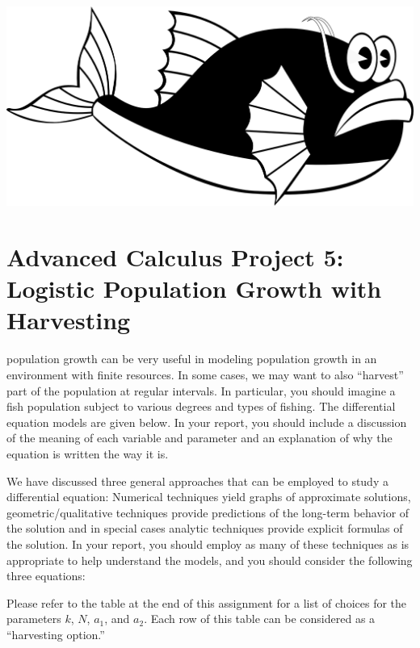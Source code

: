 \documentclass
[justified,nohyper]
{tufte-handout}
\begin{document}
\includegraphics[scale=0.3]{fish.png}
\section{Advanced Calculus Project 5: Logistic Population Growth with Harvesting}

 population growth can be very useful in modeling population growth in an environment with finite resources. In some cases, we may want to also ``harvest'' part of the population at regular intervals. In particular, you should imagine a fish population subject to various degrees and types of fishing. The differential equation models are given below. In your report, you should include a discussion of the meaning of each variable and parameter and an explanation of why the equation is written the way it is.

We have discussed three general approaches that can be employed to study a differential equation: Numerical techniques yield graphs of approximate solutions, geometric/qualitative techniques provide predictions of the long-term behavior of the solution and in special cases analytic techniques provide explicit formulas of the solution. In your report, you should employ as many of these techniques as is appropriate to help understand the models, and you should consider the following three equations:

Please refer to the table at the end of this assignment for a list of choices for the parameters $k$, $N$, $a_1$, and $a_2$. Each row of this table can be considered as a ``harvesting option.''
\end{document}
